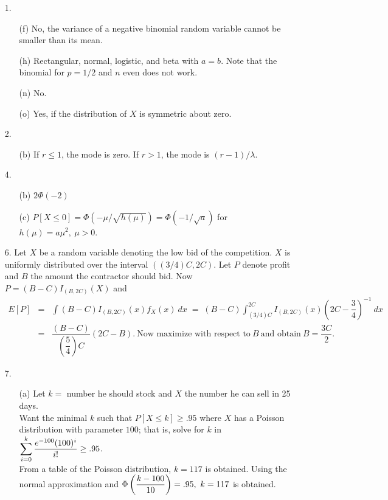 \begin{enumerate}
	\item[1.] \begin{enumerate}
		
		\item[(f)] No, the variance of a negative binomial random variable cannot be smaller than its mean.
		
		\item[(h)] Rectangular, normal, logistic, and beta with $a=b$.  Note that the binomial for $p=1/2$ and $n$ even does not work.
		
		\item[(n)] No.
		
		\item[(o)] Yes, if the distribution of $X$ is symmetric about zero.
		
	\end{enumerate}
	\item[2.] \begin{enumerate}
		
		\item[(b)] If $r\le 1$, the mode is zero.  If $r>1$, the mode is $(r-1)/\lambda$.
	\end{enumerate}
	\item[4.] \begin{enumerate}
		
		\item[(b)] $2\Phi(-2)$
		
		\item[(c)] $P[X\le 0] = \Phi(-\mu/\sqrt{h(\mu)}) = \Phi(-1/\sqrt{a})$ for $h(\mu)= a\mu^2,\ \mu >0$.
	\end{enumerate} 
	
	\item[6.] Let $X$ be a random variable denoting the low bid of the competition.  $X$ is uniformly distributed over the interval $((3/4)C,2C)$.  Let $P$ denote profit and $B$ the amount the contractor should bid.  Now $P=(B-C)I_{(B,2C)}(X)$ and 
	\begin{eqnarray*}
	E[P] &=& \int (B-C)I_{(B,2C)}(x)f_X(x)\ dx \;=\; (B-C)\int_{(3/4)C}^{2C} I_{(B,2C)}(x)\left(2C-\dfrac{3}{4}\right)^{-1}\ dx \\
	&=& \dfrac{(B-C)}{\left(\dfrac{5}{4}\right)C}(2C-B).\ \text{Now maximize with respect to}\ B\ \text{and obtain}\ B =\dfrac{3C}{2}.
	\end{eqnarray*} 
	
	\item[7.] \begin{enumerate}
		\item[(a)] Let $k =$ number he should stock and $X$ the number he can sell in 25 days. \\
		Want the minimal $k$ such that $P[X\le k] \ge .95$ where $X$ has a Poisson distribution with parameter $100$; that is, solve for $k$ in $\displaystyle \sum_{i=0}^{k} \dfrac{e^{-100}(100)^i}{i!} \ge .95$. \\
		From a table of the Poisson distribution, $k=117$ is obtained.  Using the normal approximation and $\dsp \Phi\left(\dfrac{k-100}{10}\right) = .95,\ k=117$ is obtained.


\end{enumerate}
\end{enumerate}
